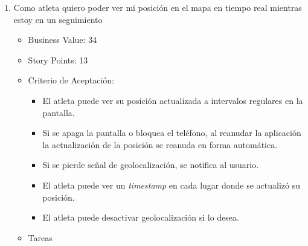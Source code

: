 \begin{enumerate}
\def\labelenumi{\arabic{enumi})}
\setcounter{enumi}{1}
\item
  Como atleta quiero poder ver mi posición en el mapa en tiempo real
  mientras estoy en un seguimiento

  \begin{itemize}
  \itemsep1pt\parskip0pt
  \item
    Business Value: 34
  \item
    Story Points: 13
  \item
    Criterio de Aceptación:

    \begin{itemize}
    \itemsep1pt\parskip0pt
    \item
      El atleta puede ver su posición actualizada a intervalos regulares
      en la pantalla.
    \item
      Si se apaga la pantalla o bloquea el teléfono, al reanudar la
      aplicación la actualización de la posición se reanuda en forma
      automática.
    \item
      Si se pierde señal de geolocalización, se notifica al usuario.
    \item
      El atleta puede ver un \emph{timestamp} en cada lugar donde se
      actualizó su posición.
    \item
      El atleta puede desactivar geolocalización si lo desea.
    \end{itemize}
  \item
    Tareas
  \end{itemize}


\end{enumerate}
